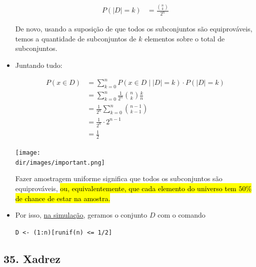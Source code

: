 \documentclass[
  11pt]{report}
\newcommand{\dir}{/ssd/R/x86_64-pc-linux-gnu-library/4.1/fnaufelRmd/rmarkdown/resources}
\newenvironment{rmdimportant}
{
  \begin{myimportant}
    \texttt{[image: \\dir/images/important.png]}
    \tcblower
  }
  {
  \end{myimportant}
}
\begin{document}
\begin{itemize}
  \[
  \begin{aligned}
  P(|D| = k)
  &= \frac{\binom{n}{k}}{2^n}
  \end{aligned}
  \]

  De novo, usando a suposição de que todos os subconjuntos são equiprováveis, temos a quantidade de subconjuntos de $k$ elementos sobre o total de subconjuntos.
\item
  Juntando tudo:

  \[
  \begin{aligned}
  P(x \in D) 
  &= \sum_{k = 0}^{n} P(x \in D \mid |D| = k) \cdot P(|D| = k) \\
  &= \sum_{k = 0}^{n} \frac 1 {2^n} \binom n k \frac k n \\
  &= \frac 1 {2^n} \sum_{k = 0}^{n} \binom{n - 1}{k - 1} \\
  &= \frac 1 {2^n} \cdot 2^{n - 1} \\
  &= \frac 1 2
  \end{aligned}
  \]

  \begin{rmdimportant}
  Fazer amostragem uniforme significa que todos os subconjuntos são equiprováveis, {\hl{ou, equivalentemente, que cada elemento do universo tem $50\%$ de chance de estar na amostra.}}

  \end{rmdimportant}
\item
  Por isso, \protect\hyperlink{simular-amigos}{na simulação}, geramos o conjunto $D$ com o comando

  \texttt{D\ \textless{}-\ (1:n){[}runif(n)\ \textless{}=\ 1/2{]}}
\end{itemize}

\hypertarget{xadrez}{%
\subsection*{35. Xadrez}\label{xadrez}}
\end{document}
